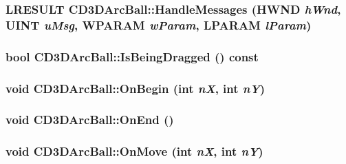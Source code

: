 \label{class_c_d3_d_arc_ball_ad100e8818466d636d428e49fbe634f5b}
\hypertarget{class_c_d3_d_arc_ball_ac2f906cc45310c55c03b6403c22817ca}{
\subsubsection[{HandleMessages}]{\setlength{\rightskip}{0pt plus 5cm}LRESULT CD3DArcBall::HandleMessages (HWND {\em hWnd}, \/  UINT {\em uMsg}, \/  WPARAM {\em wParam}, \/  LPARAM {\em lParam})}}
\label{class_c_d3_d_arc_ball_ac2f906cc45310c55c03b6403c22817ca}
\hypertarget{class_c_d3_d_arc_ball_ac7ca13b553ce0ecce4d375697d0866e3}{
\subsubsection[{IsBeingDragged}]{\setlength{\rightskip}{0pt plus 5cm}bool CD3DArcBall::IsBeingDragged () const}}
\label{class_c_d3_d_arc_ball_ac7ca13b553ce0ecce4d375697d0866e3}
\hypertarget{class_c_d3_d_arc_ball_a86882ddd7ee5330641a57b24fd8006f3}{
\subsubsection[{OnBegin}]{\setlength{\rightskip}{0pt plus 5cm}void CD3DArcBall::OnBegin ({\bf int} {\em nX}, \/  {\bf int} {\em nY})}}
\label{class_c_d3_d_arc_ball_a86882ddd7ee5330641a57b24fd8006f3}
\hypertarget{class_c_d3_d_arc_ball_abf187ce0c2926384d28166ee30df6c24}{
\subsubsection[{OnEnd}]{\setlength{\rightskip}{0pt plus 5cm}void CD3DArcBall::OnEnd ()}}
\label{class_c_d3_d_arc_ball_abf187ce0c2926384d28166ee30df6c24}
\hypertarget{class_c_d3_d_arc_ball_aab40fc2905516034b37ba0d14b6a6a76}{
\subsubsection[{OnMove}]{\setlength{\rightskip}{0pt plus 5cm}void CD3DArcBall::OnMove ({\bf int} {\em nX}, \/  {\bf int} {\em nY})}}
